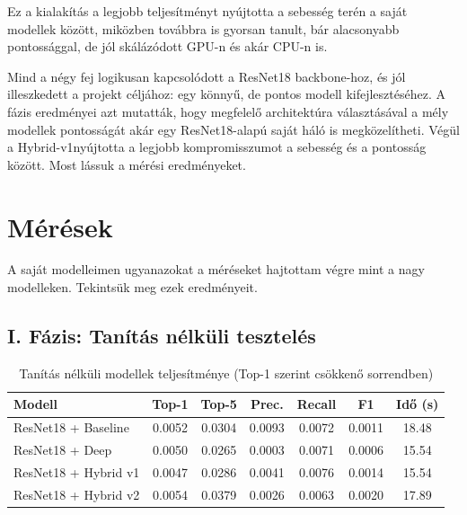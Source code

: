 Ez a kialakítás a legjobb teljesítményt nyújtotta a sebesség terén a saját modellek között, miközben továbbra is gyorsan tanult, bár alacsonyabb pontossággal, de jól skálázódott GPU-n és akár CPU-n is.

\bigskip

Mind a négy fej logikusan kapcsolódott a ResNet18 backbone-hoz, és jól illeszkedett a projekt céljához: egy könnyű, de pontos modell kifejlesztéséhez. A fázis eredményei azt mutatták, hogy megfelelő architektúra választásával a mély modellek pontosságát akár egy ResNet18-alapú saját háló is megközelítheti. Végül a Hybrid-v1nyújtotta a legjobb kompromisszumot a sebesség és a pontosság között. Most lássuk a mérési eredményeket.


    \section{Mérések}
        A saját modelleimen ugyanazokat a méréseket hajtottam végre mint a nagy modelleken. Tekintsük meg ezek eredményeit.

        \subsection{I. Fázis: Tanítás nélküli tesztelés}

        \begin{table}[H]
            \centering
            \caption{Tanítás nélküli modellek teljesítménye (Top-1 szerint csökkenő sorrendben)}
            \begin{tabular}{|l|c|c|c|c|c|c|}
            \hline
            \textbf{Modell} & \textbf{Top-1} & \textbf{Top-5} & \textbf{Prec.} & \textbf{Recall} & \textbf{F1} & \textbf{Idő (s)} \\
            \hline
            ResNet18 + Baseline & 0.0052 & 0.0304 & 0.0093 & 0.0072 & 0.0011 & 18.48 \\
            ResNet18 + Deep & 0.0050 & 0.0265 & 0.0003 & 0.0071 & 0.0006 & 15.54 \\
            ResNet18 + Hybrid v1 & 0.0047 & 0.0286 & 0.0041 & 0.0076 & 0.0014 & 15.54 \\
            ResNet18 + Hybrid v2 & 0.0054 & 0.0379 & 0.0026 & 0.0063 & 0.0020 & 17.89 \\
            \hline
            \end{tabular}
        \end{table}

